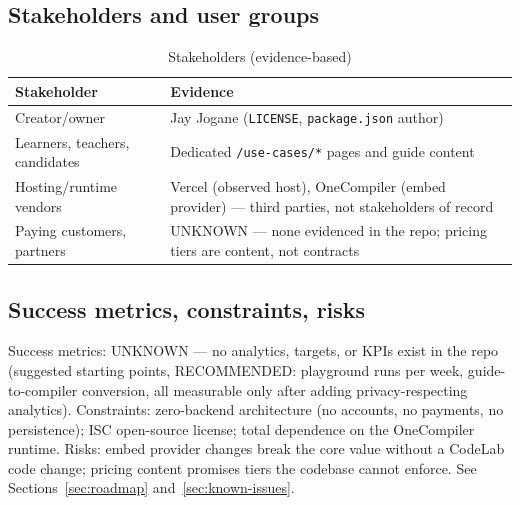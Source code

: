 \subsection{Stakeholders and user groups}
\begin{table}[H]
\centering
\caption{Stakeholders (evidence-based)}
\begin{tabular}{|l|p{8.5cm}|}
\hline
\textbf{Stakeholder} & \textbf{Evidence} \\ \hline
Creator/owner & Jay Jogane (\texttt{LICENSE}, \texttt{package.json} author) \\ \hline
Learners, teachers, candidates & Dedicated \texttt{/use-cases/*} pages and guide content \\ \hline
Hosting/runtime vendors & Vercel (observed host), OneCompiler (embed provider) --- third parties, not stakeholders of record \\ \hline
Paying customers, partners & UNKNOWN --- none evidenced in the repo; pricing tiers are content, not contracts \\ \hline
\end{tabular}
\end{table}

\subsection{Success metrics, constraints, risks}
Success metrics: UNKNOWN --- no analytics, targets, or KPIs exist in the repo (suggested starting points, RECOMMENDED: playground runs per week, guide-to-compiler conversion, all measurable only after adding privacy-respecting analytics). Constraints: zero-backend architecture (no accounts, no payments, no persistence); ISC open-source license; total dependence on the OneCompiler runtime. Risks: embed provider changes break the core value without a CodeLab code change; pricing content promises tiers the codebase cannot enforce. See Sections~\ref{sec:roadmap} and~\ref{sec:known-issues}.
